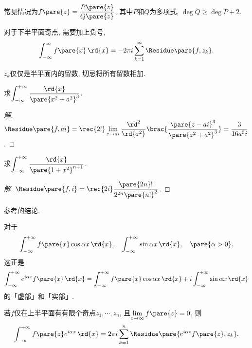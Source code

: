 \documentclass{ctexart}
\begin{document}
\begin{remark}
    常见情况为$f\pare{z} = \displaystyle \frac{P\pare{z}}{Q\pare{z}}$, 其中$P$和$Q$为多项式, $\deg Q \ge \deg P + 2$.
\end{remark}
\begin{remark}
    对于下半平面奇点, 需要加上负号,
    \[ \int_{-\infty}^\infty f\pare{x}\,\rd{x} = -2\pi i\sum_{k=1}^\infty \Residue\pare{f,z_k}. \]
\end{remark}
\begin{remark}
    $z_k$仅仅是半平面内的留数, 切忌将所有留数相加.
\end{remark}
\begin{sample}
    \begin{ex}
        求$\displaystyle \int_{-\infty}^{+\infty} \frac{\rd{x}}{\pare{x^2+a^2}^3}$.
    \end{ex}
    \begin{proof}[解]
        $\displaystyle \Residue\pare{f,ai} = \rec{2!}\displaystyle \lim_{z\rightarrow ai} \frac{\rd^2{}}{\rd{z^2}}\brac{\frac{\pare{z-ai}^3}{\pare{z^2+a^2}^3}} = \frac{3}{16a^5 i}$.
    \end{proof}
\end{sample}
\begin{sample}
    \begin{ex}
        求$\displaystyle \int_{-\infty}^{+\infty} \frac{\rd{x}}{\pare{1+x^2}^{n+1}}$.
    \end{ex}
    \begin{proof}[解]
        $\Residue\pare{f,i} = \displaystyle \rec{2i} \frac{\pare{2n}!}{2^{2n}\pare{n!}^2}$.
    \end{proof}
\end{sample}
\begin{remark}
    参考的结论.
\end{remark}
对于
\[ \int_{-\infty}^{+\infty} f\pare{x}\cos\alpha x\,\rd{x},\quad \int_{-\infty}^{+\infty} \sin\alpha x\,\rd{x},\quad \pare{\alpha > 0}. \]
这正是
\[ \int_{-\infty}^{+\infty} e^{i\alpha x} f\pare{x}\,\rd{x} = \int_{-\infty}^{+\infty} f\pare{x}\cos\alpha x\,\rd{x} + i \int_{-\infty}^{+\infty} \sin\alpha x\,\rd{x} \]
的「虚部」和「实部」.
\begin{theorem}
    若$f$仅在上半平面有有限个奇点$z_1,\cdots, z_n$, 且$\displaystyle \lim_{z\rightarrow \infty} f\pare{z} = 0$, 则
    \[ \int_{-\infty}^{+\infty} f\pare{z}e^{i\alpha x} \,\rd{x} = 2\pi i \sum_{k=1}^n \Residue\pare{e^{i\alpha z}f\pare{z}, z_k}. \]
\end{theorem}
\end{document}
